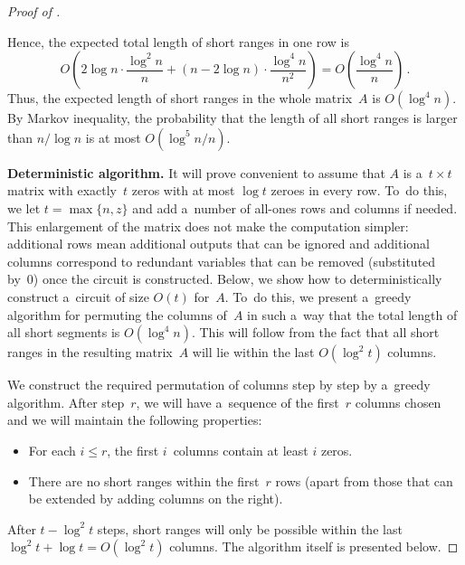 \begin{proof}[Proof of {}]
\begin{enumerate}
    \end{enumerate}
    Hence, the expected total length of short ranges in one row is
    \[O\left( 2\log n \cdot \frac{\log^2 n}{n} + (n-2\log n) \cdot \frac{\log^4 n}{n^2}\right)=O\left(\frac{\log^4 n}{n}\right) \, .\]
    Thus, the expected length of short ranges in the whole
    matrix~$A$ is $O(\log^4n)$. By Markov inequality, the probability that
    the length of all short ranges is larger than $n/\log n$ is
    at most $O(\log^5 n/n)$.

    \textbf{Deterministic algorithm.}
    It will prove convenient to assume that $A$ is a~$t \times t$ matrix with
    exactly~$t$ zeros with at most $\log t$ zeroes in every row. To~do this, we let
    $t=\max\{n, z\}$ and add a~number of all-ones rows and columns if needed. This
    enlargement of the matrix does not make the computation simpler: additional rows
    mean additional outputs that can be ignored and additional columns correspond to
    redundant variables that can be removed (substituted by~0) once the circuit is
    constructed. Below, we show how to deterministically construct a~circuit of size
    $O(t)$ for~$A$. To~do this, we present a~greedy algorithm for permuting the
    columns of~$A$ in such a~way that the total length of all short segments
    is $O(\log^4n)$. This will follow from the fact that all short ranges in the
    resulting matrix~$A$ will lie within the last $O(\log^2 t)$ columns.

    We construct the required permutation of columns step by step by a~greedy
    algorithm. After step~$r$, we will have a~sequence of the first~$r$ columns
    chosen and we will maintain the following properties:
    \begin{itemize}
        \item For each $i \leq r$, the first $i$~columns contain at least $i$ zeros.
        \item There are no short ranges within the first~$r$ rows (apart from those
        that can be extended by adding columns on the right).
    \end{itemize}

    After $t - \log^2 t$ steps, short ranges will only be possible within the last
    $\log^2 t + \log t = O(\log^2 t)$ columns. The algorithm itself is presented
    below.


\end{proof}
